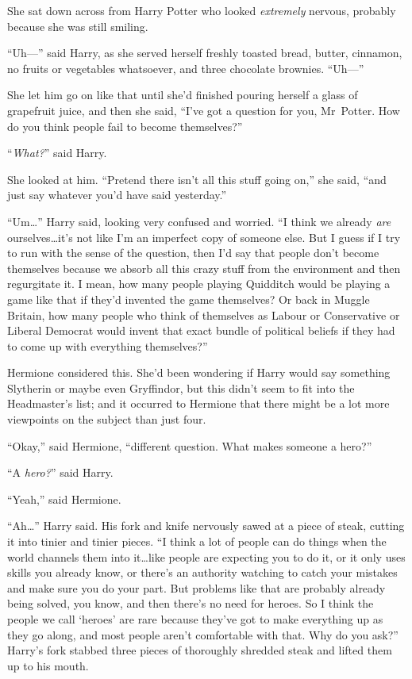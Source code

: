 She sat down across from Harry Potter who looked \emph{extremely} nervous, probably because she was still smiling.

“Uh—” said Harry, as she served herself freshly toasted bread, butter, cinnamon, no fruits or vegetables whatsoever, and three chocolate brownies. “Uh—”

She let him go on like that until she’d finished pouring herself a glass of grapefruit juice, and then she said, “I’ve got a question for you, Mr~Potter. How do you think people fail to become themselves?”

“\emph{What?}” said Harry.

She looked at him. “Pretend there isn’t all this stuff going on,” she said, “and just say whatever you’d have said yesterday.”

“Um…” Harry said, looking very confused and worried. “I think we already \emph{are} ourselves…it’s not like I’m an imperfect copy of someone else. But I guess if I try to run with the sense of the question, then I’d say that people don’t become themselves because we absorb all this crazy stuff from the environment and then regurgitate it. I mean, how many people playing Quidditch would be playing a game like that if they’d invented the game themselves? Or back in Muggle Britain, how many people who think of themselves as Labour or Conservative or Liberal Democrat would invent that exact bundle of political beliefs if they had to come up with everything themselves?”

Hermione considered this. She’d been wondering if Harry would say something Slytherin or maybe even Gryffindor, but this didn’t seem to fit into the Headmaster’s list; and it occurred to Hermione that there might be a lot more viewpoints on the subject than just four.

“Okay,” said Hermione, “different question. What makes someone a hero?”

“A \emph{hero?}” said Harry.

“Yeah,” said Hermione.

“Ah…” Harry said. His fork and knife nervously sawed at a piece of steak, cutting it into tinier and tinier pieces. “I think a lot of people can do things when the world channels them into it…like people are expecting you to do it, or it only uses skills you already know, or there’s an authority watching to catch your mistakes and make sure you do your part. But problems like that are probably already being solved, you know, and then there’s no need for heroes. So I think the people we call ‘heroes’ are rare because they’ve got to make everything up as they go along, and most people aren’t comfortable with that. Why do you ask?” Harry’s fork stabbed three pieces of thoroughly shredded steak and lifted them up to his mouth.

